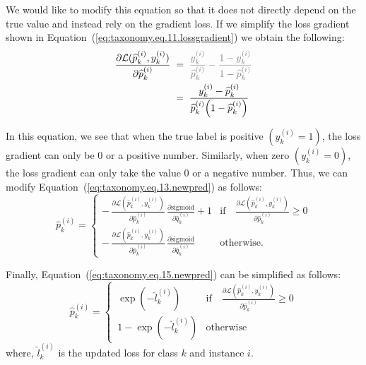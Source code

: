 \documentclass[final,1p,times,authoryear]{elsarticle}
\begin{document}
We would like to modify this equation so that it does not directly depend on the true value and instead rely on the gradient loss. If we simplify the loss gradient shown in Equation~(\ref{eq:taxonomy.eq.11.lossgradient}) we obtain the following:
\begin{align}
    \label{eq:taxonomy.eq.14.newlossgradient}
    \frac{\partial \mathcal{L}(\widehat{p}_k^{(i)}, y_k^{(i)})}{\partial \widehat{p}_k^{(i)}}
    & \; = \; \textcolor{gray}{\frac{y_k^{(i)}}{\widehat{p}_k^{(i)}} - \frac{1 - y_k^{(i)}}{1 - \widehat{p}_k^{(i)}} }
    \\
    & \; = \; \frac{y_k^{(i)} - \widehat{p}_k^{(i)}}{\widehat{p}_k^{(i)}{\left(1 - \widehat{p}_k^{(i)}\right)}}
\end{align}

In this equation, we see that when the true label is positive $\left(y_k^{(i)}=1\right) $, the loss gradient can only be 0 or a positive number. Similarly, when zero $\left(y_k^{(i)}=0\right) $, the loss gradient can only take the value 0 or a negative number. Thus, we can modify Equation~(\ref{eq:taxonomy.eq.13.newpred})  as follows:
\begin{equation}
    \label{eq:taxonomy.eq.15.newpred}
    \widehat{p}_k^{(i)} =
    \begin{cases}
        -\, \frac{\partial \mathcal{L}(\widehat{p}_k^{(i)}, y_k^{(i)})}{\partial {\widehat p}_k^{(i)}} \, \frac{\partial{\text{sigmoid}}}{\partial{\widehat{q}_k^{(i)}}} + 1
        &
        \text{if} \quad \frac{\partial \mathcal{L}(\widehat{p}_k^{(i)}, y_k^{(i)})}{\partial {\widehat p}_k^{(i)}} \geq 0
        \\
        -\, \frac{\partial \mathcal{L}(\widehat{p}_k^{(i)}, y_k^{(i)})}{\partial {\widehat p}_k^{(i)}} \, \frac{\partial{\text{sigmoid}}}{\partial{\widehat{q}_k^{(i)}}}
        &
        \text{otherwise.}
    \end{cases}
\end{equation}

Finally, Equation~(\ref{eq:taxonomy.eq.15.newpred}) can be simplified as follows:
\begin{equation}
    \label{eq:taxonomy.eq.16.newpred}
    \widehat{p}_k^{(i)} =
    \begin{cases}
        \, \exp(-\widehat{l}_k^{(i)})
        &
        \text{if} \quad \frac{\partial \mathcal{L}(\widehat{p}_k^{(i)}, y_k^{(i)})}{\partial {\widehat p}_k^{(i)}} \geq 0
        \\
        \, 1 - \exp(-\widehat{l}_k^{(i)})
        &
        \text{otherwise}
    \end{cases}
\end{equation}
where, ${\widehat l}_k^{(i)} $ is the updated loss for class $k $ and instance $i $.
\end{document}
